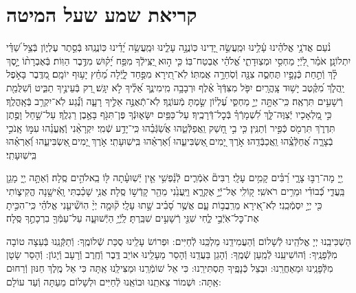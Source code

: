 \documentclass[twoside, openany, parskip=half, 11pt]{book}
\begin{document}
\chapter[קריאת שמע שעל המיטה]{ קריאת שמע שעל המיטה }

\shema

\veahavta

נֹ֨עַם אֲדֹנָ֥י אֱלֹהֵ֗ינוּ עָ֫לֵ֥ינוּ וּמַֽעֲשֵׂ֣ה יָ֭דֵינוּ כּֽוֹנֲנָ֣ה עָלֵ֑ינוּ וּמַֽעֲשֵׂ֥ה יָ֝דֵ֗ינוּ כּֽוֹנֲנֵֽהוּ׃
בְּֿסֵ֣תֶר עֶלְי֑וֹן בְּֿצֵ֥ל שַׁ֝דַּ֗י יִתְלוֹנָֽן׃
אֹמַ֗ר לַ֭יְֿיָ מַחְסִ֣י וּמְצֽוּדָתִ֑י אֱ֝לֹהַ֗י אֶבְטַח־בּֽוֹ׃
כִּ֤י ה֣וּא יַ֭צִּֽילְֿךָ מִפַּ֥ח יָ֝ק֗וּשׁ מִדֶּ֥בֶר הַוּֽוֹת׃
בְּֿאֶבְרָת֨וֹ יָ֣סֶךְ לָ֗ךְ וְֿתַ֣חַת כְּֿנָפָ֣יו תֶּחְסֶ֑ה צִנָּ֖ה וְֿסֹֽחֵרָ֣ה אֲמִתּֽוֹ׃
לֹֽא־תִ֭ירָא מִפַּ֣חַד לָ֑יְֿלָה מֵ֝חֵ֗ץ יָע֥וּף יוֹמָֽם׃
מִ֭דֶּֽבֶר בָּאֹ֣פֶל יַֽהֲלֹ֑ךְ מִ֝קֶּ֗טֶב יָשׁ֥וּד צָֽהֳרָֽיִם׃
יִפֹּ֤ל מִצִּדְּֿךָ֙ אֶ֗לֶף וּרְבָבָ֥ה מִֽימִינֶ֑ךָ אֵ֝לֶ֗יךָ לֹ֣א יִגָּֽשׁ׃
רַ֭ק בְּֿעֵינֶ֣יךָ תַבִּ֑יט וְֿשִׁלֻּמַ֖ת רְֿשָׁעִ֣ים תִּרְאֶֽה׃
כִּֽי־אַתָּ֣ה יְיָ֣ מַחְסִּ֑י עֶ֝לְי֗וֹן שַׂ֣מְתָּ מְֿעוֹנֶֽךָ׃
לֹֽא־תְֿאֻנֶּ֣ה אֵלֶ֣יךָ רָעָ֑ה וְֿנֶ֗֝גַע לֹֽא־יִקְרַ֥ב בְּֿאָֽהֳלֶֽךָ׃
כִּ֣י מַ֭לְאָכָיו יְֿצַוֶּה־לָּ֑ךְ לִ֝שְׁמָרְֿךָ֗ בְּֿכׇל־דְּֿרָכֶֽיךָ׃
עַל־כַּפַּ֥יִם יִשָּׂא֑וּנְֿךָ פֶּן־תִּגֹּ֖ף בָּאֶ֣בֶן רַגְלֶֽךָ׃
עַל־שַׁ֣חַל וָפֶ֣תֶן תִּדְרֹ֑ךְ תִּרְמֹ֖ס כְּֿפִ֣יר וְֿתַנִּֽין׃
כִּ֤י בִ֣י חָ֭שַׁק וַֽאֲפַלְּֿטֵ֑הוּ אֲשַׂ֝גְּֿבֵ֗הוּ כִּֽי־יָדַ֥ע שְֿׁמִֽי׃
יִקְרָאֵ֨נִי וְֽֿאֶֽעֱנֵ֗הוּ עִמּ֣וֹ אָֽנֹכִ֣י בְֿצָרָ֑ה אֲ֝חַלְּֿצֵֽ֗הוּ וַֽאֲכַבְּֿדֵֽהוּ׃
אֹ֣רֶךְ יָ֭מִים ֖אַשְׂבִּיעֵ֑הוּ וְֿ֝אַרְאֵ֗הוּ בִּֽישֽׁוּעָתִֽי׃
אֹ֣רֶךְ יָ֭מִים ֖אַשְׂבִּיעֵ֑הוּ וְֿ֝אַרְאֵ֗הוּ בִּֽישֽׁוּעָתִֽי׃

יְ֖יָ מָה־רַבּ֣וּ צָרָ֑י רַ֝בִּ֗ים קָמִ֥ים עָלָֽי׃ רַבִּים֘ אֹֽמְֿרִ֢ים לְֿנַ֫פְשִׁ֥י אֵ֤ין יְֿשֽׁוּעָ֓תָה לּ֖וֹ בֵֽאלֹהִ֣ים סֶֽלָה׃ וְֿאַתָּ֣ה יְ֖יָ מָגֵ֥ן בַּֽעֲדִ֑י כְּֿ֝בוֹדִ֗י וּמֵרִ֥ים רֹאשִֽׁי׃ ק֭וֹלִֽי אֶל־יְֿיָ֣ אֶקְרָ֑א וַיַּֽעֲנֵ֙נִי מֵהַ֖ר קָדְֿשׁ֣וֹ סֶֽלָה׃ אֲנִ֥י שָׁכַ֗בְתִּי וָֽאִ֫ישָׁ֥נָה הֱקִיצ֑וֹתִי כִּ֖י יְיָ֣ יִסְמְֿכֵֽנִי׃ לֹֽא־אִ֭ירָא מֵרִֽבֲב֥וֹת עָ֑ם אֲשֶׁ֥ר סָ֝בִ֗יב שָׁ֣תוּ עָלָֽי׃ ק֘וּמָ֤ה יְיָ֨ הֽוֹשִׁ֘יעֵ֤נִי אֱלֹהַ֗י כִּֽי־הִכִּ֣יתָ אֶת־כׇּל־אֹֽיְֿבַ֣י לֶ֑חִי שִׁנֵּ֖י רְֿשָׁעִ֣ים שִׁבַּֽרְתָּ׃ לַֽיְֿיָ֥ הַיְֿשׁוּעָ֑ה עַל־עַמְּֿךָ֖ בִרְכָתֶ֣ךָ סֶּֽלָה׃

הַשְׁכִּיבֵֽנוּ יְיָ אֱלֹהֵֽינוּ לְֿשָׁלוֹם וְֿהַעֲמִידֵֽנוּ מַלְכֵּֽנוּ לְֿחַיִּים: וּפְרוֹשׂ עָלֵֽינוּ סֻכַּת שְֿׁלוֹמֶֽךָ: וְֿתַקְּֿנֵֽנוּ בְּֿעֵצָה טוֹבָה מִלְּֿפָנֶֽיךָ: וְֿהוֹשִׁיעֵֽנוּ לְֿמַֽעַן שְֿׁמֶֽךָ: וְֿהָגֵן בַּעֲדֵֽנוּ וְֿהָסֵר מֵעָלֵֽינוּ אוֹיֵב דֶּֽבֶר וְֿחֶֽרֶב וְֿרָעָב וְֿיָגוֹן: וְֿהָסֵר שָׂטָן מִלְּֿפָנֵֽינוּ וּמֵאַחֲרֵֽנוּ: וּבְצֵל כְּֿנָפֶֽיךָ תַּסְתִּירֵֽנוּ: כִּי אֵל שׁוֹמְֿרֵֽנוּ וּמַצִּילֵֽנוּ אַֽתָּה כִּי אֵל מֶֽלֶךְ חַנּוּן וְֿרַחוּם אַֽתָּה: וּשְׁמוֹר צֵאתֵֽנוּ וּבוֹאֵֽנוּ לְֿחַיִּים וּלְשָׁלוֹם מֵעַתָּה וְֿעַד עוֹלָם:
\end{document}
